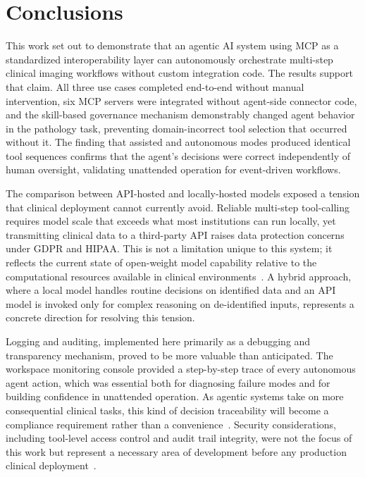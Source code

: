 \documentclass[conference]{IEEEtran}
\begin{document}
\section{Conclusions}

This work set out to demonstrate that an agentic AI system using MCP as a standardized interoperability layer can autonomously orchestrate multi-step clinical imaging workflows without custom integration code. The results support that claim. All three use cases completed end-to-end without manual intervention, six MCP servers were integrated without agent-side connector code, and the skill-based governance mechanism demonstrably changed agent behavior in the pathology task, preventing domain-incorrect tool selection that occurred without it. The finding that assisted and autonomous modes produced identical tool sequences confirms that the agent's decisions were correct independently of human oversight, validating unattended operation for event-driven workflows.

The comparison between API-hosted and locally-hosted models exposed a tension that clinical deployment cannot currently avoid. Reliable multi-step tool-calling requires model scale that exceeds what most institutions can run locally, yet transmitting clinical data to a third-party API raises data protection concerns under GDPR and HIPAA. This is not a limitation unique to this system; it reflects the current state of open-weight model capability relative to the computational resources available in clinical environments~\cite{agiformedicalimaging2025}. A hybrid approach, where a local model handles routine decisions on identified data and an API model is invoked only for complex reasoning on de-identified inputs, represents a concrete direction for resolving this tension.

Logging and auditing, implemented here primarily as a debugging and transparency mechanism, proved to be more valuable than anticipated. The workspace monitoring console provided a step-by-step trace of every autonomous agent action, which was essential both for diagnosing failure modes and for building confidence in unattended operation. As agentic systems take on more consequential clinical tasks, this kind of decision traceability will become a compliance requirement rather than a convenience~\cite{trustworthyai2025, dietrich2025agentic}. Security considerations, including tool-level access control and audit trail integrity, were not the focus of this work but represent a necessary area of development before any production clinical deployment~\cite{transformingclinical2026}.
\end{document}
